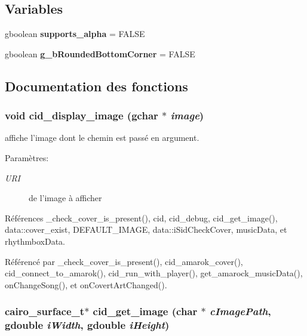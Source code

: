 \subsection*{Variables}
\begin{CompactItemize}
\item 
gboolean {\bf supports\_\-alpha} = FALSE
\item 
gboolean {\bf g\_\-bRoundedBottomCorner} = FALSE
\end{CompactItemize}


\subsection{Documentation des fonctions}
\subsubsection{\setlength{\rightskip}{0pt plus 5cm}void cid\_\-display\_\-image (gchar $\ast$ {\em image})}\label{cid-main_8c_be808f989332d9ce71a86c33ad7f74cd}


affiche l'image dont le chemin est passé en argument. \begin{Desc}
\item[Paramètres:]
\begin{description}
\item[{\em URI}]de l'image à afficher \end{description}
\end{Desc}


Références \_\-check\_\-cover\_\-is\_\-present(), cid, cid\_\-debug, cid\_\-get\_\-image(), data::cover\_\-exist, DEFAULT\_\-IMAGE, data::iSidCheckCover, musicData, et rhythmboxData.

Référencé par \_\-check\_\-cover\_\-is\_\-present(), cid\_\-amarok\_\-cover(), cid\_\-connect\_\-to\_\-amarok(), cid\_\-run\_\-with\_\-player(), get\_\-amarock\_\-musicData(), onChangeSong(), et onCovertArtChanged().
\subsubsection{\setlength{\rightskip}{0pt plus 5cm}cairo\_\-surface\_\-t$\ast$ cid\_\-get\_\-image (char $\ast$ {\em cImagePath}, \/  gdouble {\em iWidth}, \/  gdouble {\em iHeight})}\label{cid-main_8c_1121724113cecd85ccc5b9bdac49694e}




